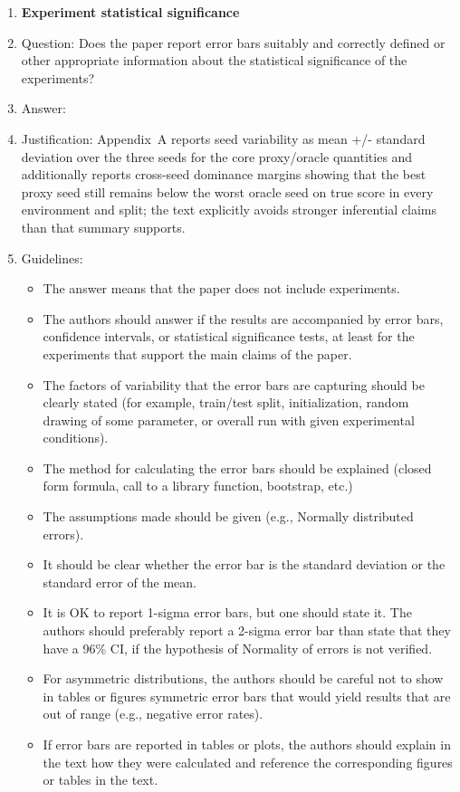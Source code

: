 \documentclass{article}
\begin{document}
\begin{enumerate}
\item {\bf Experiment statistical significance}
    \item[] Question: Does the paper report error bars suitably and correctly defined or other appropriate information about the statistical significance of the experiments?
    \item[] Answer: \answerYes{}
    \item[] Justification: Appendix~A reports seed variability as mean +/- standard deviation over the three seeds for the core proxy/oracle quantities and additionally reports cross-seed dominance margins showing that the best proxy seed still remains below the worst oracle seed on true score in every environment and split; the text explicitly avoids stronger inferential claims than that summary supports.
    \item[] Guidelines:
    \begin{itemize}
        \item The answer \answerNA{} means that the paper does not include experiments.
        \item The authors should answer \answerYes{} if the results are accompanied by error bars, confidence intervals, or statistical significance tests, at least for the experiments that support the main claims of the paper.
        \item The factors of variability that the error bars are capturing should be clearly stated (for example, train/test split, initialization, random drawing of some parameter, or overall run with given experimental conditions).
        \item The method for calculating the error bars should be explained (closed form formula, call to a library function, bootstrap, etc.)
        \item The assumptions made should be given (e.g., Normally distributed errors).
        \item It should be clear whether the error bar is the standard deviation or the standard error of the mean.
        \item It is OK to report 1-sigma error bars, but one should state it. The authors should preferably report a 2-sigma error bar than state that they have a 96\% CI, if the hypothesis of Normality of errors is not verified.
        \item For asymmetric distributions, the authors should be careful not to show in tables or figures symmetric error bars that would yield results that are out of range (e.g., negative error rates).
        \item If error bars are reported in tables or plots, the authors should explain in the text how they were calculated and reference the corresponding figures or tables in the text.
    \end{itemize}


\end{enumerate}
\end{document}
